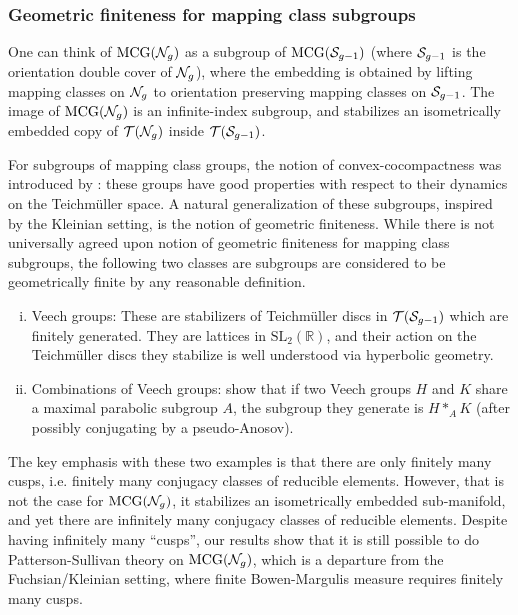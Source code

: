 \subsubsection*{Geometric finiteness for mapping class subgroups}

One can think of $\mathrm{MCG}(\mathcal{N}_g)$ as a subgroup of $\mathrm{MCG}(\mathcal{S}_{g-1})$ (where $\mathcal{S}_{g-1}$ is the orientation double cover of $\mathcal{N}_g$), where the embedding is obtained by lifting mapping classes on $\mathcal{N}_g$ to orientation preserving mapping classes on $\mathcal{S}_{g-1}$.
The image of $\mathrm{MCG}(\mathcal{N}_g)$ is an infinite-index subgroup, and stabilizes an isometrically embedded copy of $\mathcal{T}(\mathcal{N}_g)$ inside $\mathcal{T}(\mathcal{S}_{g-1})$.

For subgroups of mapping class groups, the notion of convex-cocompactness was introduced by \textcite{farb2002convex}: these groups have good properties with respect to their dynamics on the Teichmüller space.
A natural generalization of these subgroups, inspired by the Kleinian setting, is the notion of geometric finiteness.
While there is not universally agreed upon notion of geometric finiteness for mapping class subgroups, the following two classes are subgroups are considered to be geometrically finite by any reasonable definition.

\begin{enumerate}[(i)]
\item Veech groups: These are stabilizers of Teichmüller discs in $\mathcal{T}(\mathcal{S}_{g-1})$ which are finitely generated.
  They are lattices in $\mathrm{SL}_2(\mathbb{R})$, and their action on the Teichmüller discs they stabilize is well understood via hyperbolic geometry.
\item Combinations of Veech groups: \textcite{leininger2006combination} show that if two Veech groups $H$ and $K$ share a maximal parabolic subgroup $A$, the subgroup they generate is $H \ast_A K$ (after possibly conjugating by a pseudo-Anosov).
\end{enumerate}

The key emphasis with these two examples is that there are only finitely many cusps, i.e. finitely many conjugacy classes of reducible elements.
However, that is not the case for $\mathrm{MCG}(\mathcal{N}_g)$, it stabilizes an isometrically embedded sub-manifold, and yet there are infinitely many conjugacy classes of reducible elements.
Despite having infinitely many ``cusps'', our results show that it is still possible to do Patterson-Sullivan theory on $\mathrm{MCG}(\mathcal{N}_g)$, which is a departure from the Fuchsian/Kleinian setting, where finite Bowen-Margulis measure requires finitely many cusps.

